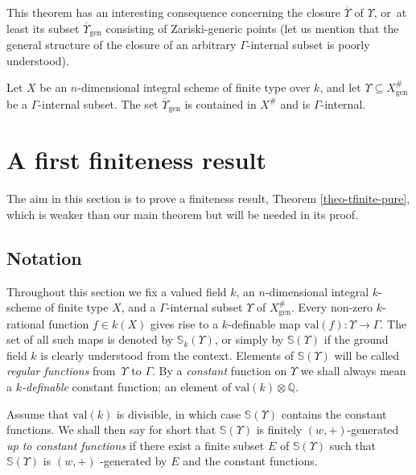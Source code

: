 \documentclass[JEP,XML,SOM,Unicode,ThmDefs,NoEqCountersInSection,published]{cedram}
\newcommand{\val}{\mathrm{val}}
\newcommand{\Q}{\mathbb Q}
\renewcommand{\SS}{\mathbb S}
\theoremstyle{plain}
\theoremstyle{definition}
\begin{document}
This theorem has an interesting consequence concerning the closure
$\overline{\Upsilon}$ of $\Upsilon$,
or~at least its subset $\overline{\Upsilon}_{\mathrm{gen}}$
consisting of Zariski-generic points (let us mention that the general structure of the closure of an arbitrary $\Gamma$-internal subset is poorly understood).

\begin{coro}\label{closure-gamma-internal}
Let $X$ be
an $n$\nobreakdash-dimen\-sional integral scheme of finite type over $k$,
and let $\Upsilon\subseteq X^\#_{\mathrm{gen}}$ be
a $\Gamma$-internal subset.
The set $\overline{\Upsilon}_{\mathrm{gen}}$
is contained in $X^\#$ and is $\Gamma$-internal.
\end{coro}

\section{A first finiteness result}\label{t-finite-pure}\label{section3}

The aim in this section is to prove
a finiteness result, Theorem \ref{theo-tfinite-pure}, which is weaker
than our main theorem but will be needed in its proof.

\subsection{Notation}
Throughout this section we fix a valued field $k$, an
$n$\nobreakdash-dimen\-sional integral $k$-scheme of finite type $X$, and a $\Gamma$-internal subset
$\Upsilon$ of $X^{\#}_{\mathrm{gen}}$. Every non-zero
$k$-rational function $f\in k(X)$ gives rise to a $k$-definable map
$\val (f) \colon \Upsilon \to \Gamma$. The set of all such maps is denoted by $\SS_k(\Upsilon)$, or simply by $\SS(\Upsilon)$
if the ground field $k$ is clearly understood from the context. Elements
of $\SS(\Upsilon)$ will be called \textit{regular functions} from~$\Upsilon$ to $\Gamma$.
By a \textit{constant} function on $\Upsilon$ we shall always mean
a \textit{$k$-definable} constant function; \ie an element of $\val (k)\otimes \Q$.

Assume that $\val (k)$ is divisible, in which
case $\SS(\Upsilon)$ contains the constant functions.
We shall then say for short that $\SS(\Upsilon)$ is
finitely $(w,+)$-generated \textit{up to constant functions}
if there exist a finite subset $E$ of
$\SS(\Upsilon)$ such that $\SS(\Upsilon)$
is $(w,+)$ -generated by $E$
and the constant functions.
\end{document}
